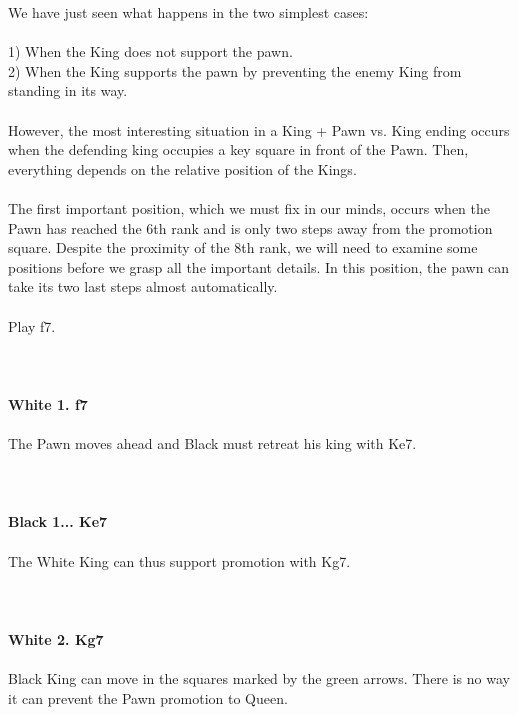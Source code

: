 \documentclass{article}
\begin{document}
We have just seen what happens in the two simplest cases:\\\\1) When the King does not support the pawn.\\2) When the King supports the pawn by preventing the enemy King from standing in its way.\\\\However, the most interesting situation in a King + Pawn vs. King ending occurs when the defending king occupies a key square in front of the Pawn. Then, everything depends on the relative position of the Kings.\\\\The first important position, which we must fix in our minds, occurs when the Pawn has reached the 6th rank and is only two steps away from the promotion square. Despite the proximity of the 8th rank, we will need to examine some positions before we grasp all the important details. In this position, the pawn can take its two last steps almost automatically.\\\\Play f7.\\
\\

\\
\\
\textbf{White 1. f7}\\
\\
The Pawn moves ahead and Black must retreat his king with Ke7.\\
\\

\\
\\
\textbf{Black 1... Ke7}\\
\\
The White King can thus support promotion with Kg7.\\
\\

\\
\\
\textbf{White 2. Kg7}\\
\\
Black King can move in the squares marked by the green arrows. There is no way it can prevent the Pawn promotion to Queen.\\\\
\\
\end{document}
